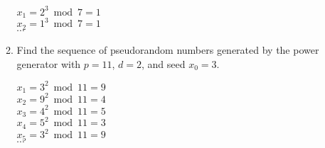 \documentclass[11pt]{article}
\begin{document}
\begin{enumerate}[label=\textbf{\arabic*.}]
\begin{enumerate}[label=\textbf{\alph*)}]
		$x_1 = 2^3 \bmod 7 = 1$ \\
		$x_2 = 1^3 \bmod 7 = 1$ \\
		$\cdots$
		
		\item Find the sequence of pseudorandom numbers generated by the power generator with $p = 11$, $d = 2$, and seed $x_0 = 3$.
		
		$x_1 = 3^2 \bmod 11 = 9$ \\
		$x_2 = 9^2 \bmod 11 = 4$ \\
		$x_3 = 4^2 \bmod 11 = 5$ \\
		$x_4 = 5^2 \bmod 11 = 3$ \\
		$x_5 = 3^2 \bmod 11 = 9$ \\
		$\cdots$
	\end{enumerate}
\end{enumerate}
\end{document}
